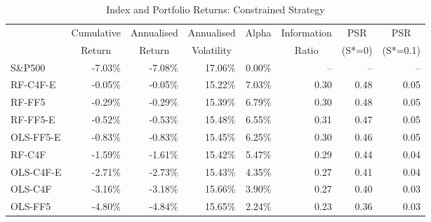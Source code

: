 \begin{table}[H]
\centering
\caption{Index and Portfolio Returns: Constrained Strategy}
\label{tab:constr}
\begin{tabular}{lrrrrrrr}
\toprule
{} & \multicolumn{1}{c}{Cumulative} & \multicolumn{1}{c}{Annualised} & \multicolumn{1}{c}{Annualised} & \multicolumn{1}{c}{Alpha} & \multicolumn{1}{c}{Information} & \multicolumn{1}{c}{PSR} & \multicolumn{1}{c}{PSR} \\
{} & \multicolumn{1}{c}{Return} & \multicolumn{1}{c}{Return} & \multicolumn{1}{c}{Volatility} & {} & \multicolumn{1}{c}{Ratio} & \multicolumn{1}{c}{(S*=0)} & \multicolumn{1}{c}{(S*=0.1)} \\
\midrule
S\&P500 & -7.03\% & -7.08\% & 17.06\% & 0.00\% & -- & -- & -- \\
RF-C4F-E & -0.05\% & -0.05\% & 15.22\% & 7.03\% & 0.30 & 0.48 & 0.05 \\
RF-FF5 & -0.29\% & -0.29\% & 15.39\% & 6.79\% & 0.30 & 0.48 & 0.05 \\
RF-FF5-E & -0.52\% & -0.53\% & 15.48\% & 6.55\% & 0.31 & 0.47 & 0.05 \\
OLS-FF5-E & -0.83\% & -0.83\% & 15.45\% & 6.25\% & 0.30 & 0.46 & 0.05 \\
RF-C4F & -1.59\% & -1.61\% & 15.42\% & 5.47\% & 0.29 & 0.44 & 0.04 \\
OLS-C4F-E & -2.71\% & -2.73\% & 15.43\% & 4.35\% & 0.27 & 0.41 & 0.04 \\
OLS-C4F & -3.16\% & -3.18\% & 15.66\% & 3.90\% & 0.27 & 0.40 & 0.03 \\
OLS-FF5 & -4.80\% & -4.84\% & 15.65\% & 2.24\% & 0.23 & 0.36 & 0.03 \\
\bottomrule
\end{tabular}
\end{table}


